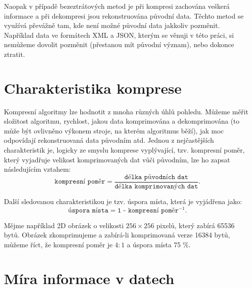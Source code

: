 Naopak v případě bezeztrátových metod je při kompresi zachována veškerá informace a při dekompresi
jsou rekonstruována původní data. Těchto metod se využívá převážně tam, kde není možné původní data jakkoliv pozměnit. Například data ve formátech XML a JSON, kterým se věnuji v této práci, si nemůžeme dovolit pozměnit (přestanou mít původní význam), nebo dokonce ztratit.

\section{Charakteristika komprese}
Kompresní algoritmy lze hodnotit z mnoha různých úhlů pohledu. Můžeme měřit složitost algoritmu, rychlost, jakou data komprimována a dekomprimována (to může být ovlivněno výkonem stroje, na kterém algoritmus běží), jak moc odpovídají rekonstruovaná data původním atd.
Jednou z nejčastějších charakteristik je, logicky ze smyslu komprese vy\-plý\-va\-jí\-cí, tzv. kompresní poměr, který vyjadřuje velikost komprimovaných dat vůči původním, lze ho zapsat následujícím  vztahem:
\begin{equation}
\texttt{kompresní poměr} = \frac{\texttt{délka původních dat}}{\texttt{délka komprimovaných dat}}.
\end{equation}

Další sledovanou charakteristikou je tzv. úspora místa, která je vyjádřena jako:
\begin{equation}
\texttt{úspora místa} = \texttt{1 - kompresní poměr$^{-1}$}.
\end{equation}

Mějme například 2D obrázek o velikosti $256\times256$ pixelů, který zabírá 65536 bytů. Obrázek zkomprimujeme a zabírá-li komprimovaná verze 16384 bytů, můžeme říct, že kompresní poměr je $4:1$ a úspora místa 75 \%. 

\section{Míra informace v datech}
